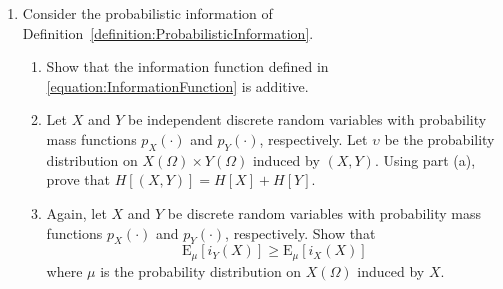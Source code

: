 \begin{enumerate}

\item Consider the probabilistic information of Definition~\ref{definition:ProbabilisticInformation}.
\begin{enumerate}
\item Show that the information function defined in \eqref{equation:InformationFunction} is additive.
\item Let $X$ and $Y$ be independent discrete random variables with probability mass functions $p_X(\cdot)$ and $p_Y (\cdot)$, respectively.
Let $\upsilon$ be the probability distribution on $X(\Omega) \times Y(\Omega)$ induced by $(X,Y)$.
Using part (a), prove that $H[(X,Y)] = H [X] + H[Y]$. 
\item Again, let $X$ and $Y$ be discrete random variables with probability mass functions $p_X(\cdot)$ and $p_Y (\cdot)$, respectively.
Show that
\begin{equation*}
\mathrm{E}_{\mu} [i_Y (X)] \geq \mathrm{E}_{\mu} [i_X (X)]
\end{equation*}
where $\mu$ is the probability distribution on $X(\Omega)$ induced by $X$.
\end{enumerate}


\end{enumerate}
